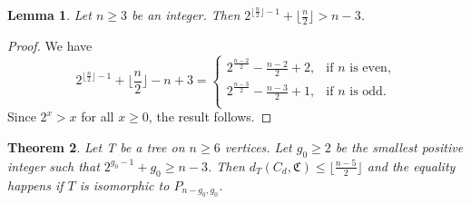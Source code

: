 \documentclass[11pt]{article}
\newtheorem{theorem}{Theorem}[section]
\newtheorem{lemma}[theorem]{Lemma}
\begin{document}
\begin{lemma}\label{lem:cd}
Let $n\geq 3$ be an integer.  Then $2^{\lfloor\frac{n}{2}\rfloor-1}+\lfloor\frac{n}{2}\rfloor> n-3$.
\end{lemma}
\begin{proof}
We have 
$$2^{\lfloor\frac{n}{2}\rfloor-1}+\lfloor \frac{n}{2} \rfloor - n + 3= \left\{
\begin{array}{ll}
  2^{\frac{n-2}{2}}-\frac{n-2}{2}+2 ,  &\text{if $n$ is even,}\\
  2^{\frac{n-3}{2}}-\frac{n-3}{2}+1, &\text{if $n$ is odd.}\\
\end{array}
\right.$$
Since $2^x>x$ for all $x\geq 0$, the result follows.
\end{proof}
\begin{theorem}\label{thm:cd2}
Let T be a tree on $n\geq 6$ vertices. Let $g_0\geq 2$ be the smallest positive integer such that $2^{g_0-1}+g_0\geq n-3$. Then  $d_T(C_d,\mathfrak{C})\leq \lfloor \frac{n-5}{2} \rfloor$ and the equality happens if $T$ is isomorphic to $P_{n-g_0,g_0}$.
\end{theorem}
\end{document}
